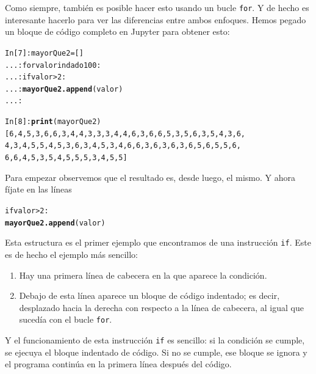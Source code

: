 \documentclass[10pt,a4paper]{article}\usepackage[]{graphicx}\usepackage[]{color}
\makeatletter
\newcommand{\hlkwd}[1]{\textcolor[rgb]{0.737,0.353,0.396}{\textbf{#1}}}%
\newenvironment{kframe}{%
 \def\at@end@of@kframe{}%
 \ifinner\ifhmode%
  \def\at@end@of@kframe{\end{minipage}}%
  \begin{minipage}{\columnwidth}%
 \fi\fi%
 \def\FrameCommand##1{\hskip\@totalleftmargin \hskip-\fboxsep
 \colorbox{shadecolor}{##1}\hskip-\fboxsep
     \hskip-\linewidth \hskip-\@totalleftmargin \hskip\columnwidth}%
 \MakeFramed {\advance\hsize-\width
   \@totalleftmargin\z@ \linewidth\hsize
   \@setminipage}}%
 {\par\unskip\endMakeFramed%
 \at@end@of@kframe}
\newenvironment{knitrout}{}{} %
\newcounter {cont01}
\makeatother
\begin{document}
Como siempre, también es posible hacer esto usando un bucle {\tt for}. Y de hecho es interesante hacerlo para ver las diferencias entre ambos enfoques. Hemos pegado un bloque de código completo en Jupyter para obtener esto:
\begin{knitrout}
\color{fgcolor}\begin{kframe}
\begin{alltt}
In [7]: mayorQue2 = []
   ...: for valor in dado100:
   ...:     if valor > 2:
   ...:         \hlkwd{mayorQue2.append}(valor)
   ...:

In [8]: \hlkwd{print}(mayorQue2)
[6, 4, 5, 3, 6, 6, 3, 4, 4, 3, 3, 3, 4, 4, 6, 3, 6, 6, 5, 3, 5, 6, 3, 5, 4, 3, 6,
4, 3, 4, 5, 5, 4, 5, 3, 6, 3, 4, 5, 3, 4, 6, 6, 3, 6, 3, 6, 3, 6, 5, 6, 5, 5, 6,
6, 6, 4, 5, 3, 5, 4, 5, 5, 5, 3, 4, 5, 5]
\end{alltt}
\end{kframe}
\end{knitrout}
Para empezar observemos que el resultado es, desde luego, el mismo. Y ahora fíjate en las líneas
\begin{knitrout}
\color{fgcolor}\begin{kframe}
\begin{alltt}
if valor > 2:
    \hlkwd{mayorQue2.append}(valor)
\end{alltt}
\end{kframe}
\end{knitrout}
Esta estructura es el primer ejemplo que encontramos de una {\sf instrucción} {\tt if}. Este es de hecho el ejemplo más sencillo:
\begin{enumerate}
\item Hay una primera línea de cabecera en la que aparece la condición.
\item Debajo de esta línea aparece un bloque de código indentado; es decir, desplazado hacia la derecha con respecto a la línea de cabecera, al igual que sucedía con el bucle {\tt for}.
\end{enumerate}
Y el funcionamiento de esta instrucción {\tt if} es sencillo: si la condición se cumple, se ejecuya el bloque indentado de código. Si no se cumple, ese bloque se ignora y el programa continúa en la primera línea después del código.
\end{document}
